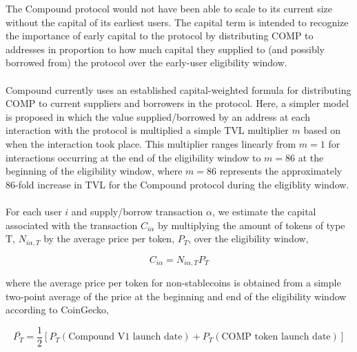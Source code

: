 \documentclass[12pt]{article}
\begin{document}
The Compound protocol would not have been able to scale to its current size without
the capital of its earliest users. The capital term is intended to recognize the
importance of early capital to the protocol by distributing COMP to addresses in
proportion to how much capital they supplied to (and possibly borrowed from) the
protocol over the early-user eligibility window.
\\\\
Compound currently uses an established capital-weighted formula for distributing
COMP to current suppliers and borrowers in the protocol. Here, a simpler model is
proposed in which the value supplied/borrowed by an address at each interaction
with the protocol is multiplied a simple TVL multiplier $m$ based on
when the interaction took place. This multiplier ranges linearly from $m = 1$
for interactions occurring at the end of the eligibility window to $m = 86$ at the
beginning of the eligibility window, where $m = 86$ represents the approximately 86-fold
increase in TVL for the Compound protocol during the eligiblity window.
\\\\
For each user $i$ and supply/borrow transaction $\alpha$, we estimate the capital
associated with the transaction $C_{i\alpha}$ by multiplying the amount of tokens
of type T, $N_{i\alpha,T}$ by the average price per token, $P_T$, over the eligibility window,

\begin{equation*}
  C_{i\alpha} = N_{i\alpha,T}P_T
\end{equation*}

where the average price per token for non-stablecoins is obtained from a simple two-point average
of the price at the beginning and end of the eligibility window according to CoinGecko,

\begin{equation*}
  \bar{P_T} = \frac{1}{2}\left[P_T(\textrm{Compound V1 launch date}) + P_T(\textrm{COMP token launch date})\right]
\end{equation*}
\end{document}
